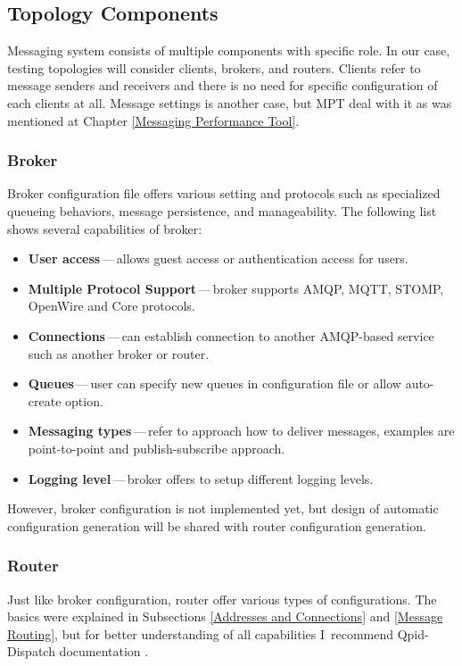 \subsection{Topology Components}
Messaging system consists of multiple components with specific role. In our case, testing topologies will consider clients, brokers, and routers. Clients refer to message senders and receivers and there is no need for specific configuration of each clients at all. Message settings is another case, but MPT deal with it as was mentioned at Chapter \ref{Messaging Performance Tool}.

\subsubsection*{Broker}
Broker configuration file offers various setting and protocols such as specialized queueing behaviors, message persistence, and manageability. The following list shows several capabilities of broker:

\begin{itemize}
	\setlength\itemsep{0em}
	\item \textbf{User access}\,---\,allows guest access or authentication access for users.
	\item \textbf{Multiple Protocol Support}\,---\,broker supports AMQP, MQTT, STOMP, OpenWire and Core protocols.
	\item \textbf{Connections}\,---\,can establish connection to another AMQP-based service such as another broker or router.
	\item \textbf{Queues}\,---\,user can specify new queues in configuration file or allow auto-create option.
	\item \textbf{Messaging types}\,---\,refer to approach how to deliver messages, examples are point-to-point and publish-subscribe approach.
	\item \textbf{Logging level}\,---\,broker offers to setup different logging levels.
\end{itemize}
However, broker configuration is not implemented yet, but design of automatic configuration generation will be shared with router configuration generation.

\subsubsection*{Router}
Just like broker configuration, router offer various types of configurations. The basics were explained in Subsections \ref{Addresses and Connections} and \ref{Message Routing}, but for better understanding of all capabilities I~recommend Qpid-Dispatch documentation \cite{RH:Interconnect}.

